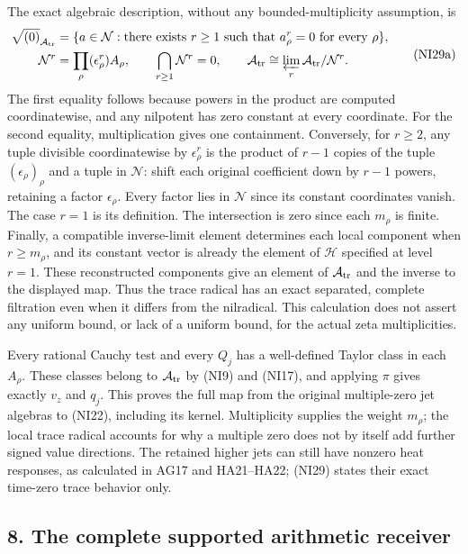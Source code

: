 \documentclass[
  10pt,
  a4paper,
]{article}
\begin{document}
The exact algebraic description, without any bounded-multiplicity
assumption, is \[
\begin{aligned}
\sqrt{(0)}_{\mathcal A_{\rm tr}}
&=\{a\in\mathcal N:\text{there exists }r\ge1
\text{ such that }a_\rho^r=0\text{ for every }\rho\},\\
\mathcal N^r&=\prod_\rho(\epsilon_\rho^r)A_\rho,
\qquad \bigcap_{r\ge1}\mathcal N^r=0,
\qquad \mathcal A_{\rm tr}\cong
\varprojlim_r\mathcal A_{\rm tr}/\mathcal N^r.
\end{aligned}
\tag{NI29a}
\] The first equality follows because powers in the product are computed
coordinatewise, and any nilpotent has zero constant at every coordinate.
For the second equality, multiplication gives one containment.
Conversely, for \(r\ge2\), any tuple divisible coordinatewise by
\(\epsilon_\rho^r\) is the product of \(r-1\) copies of the tuple
\((\epsilon_\rho)_\rho\) and a tuple in \(\mathcal N\): shift each
original coefficient down by \(r-1\) powers, retaining a factor
\(\epsilon_\rho\). Every factor lies in \(\mathcal N\) since its
constant coordinates vanish. The case \(r=1\) is its definition. The
intersection is zero since each \(m_\rho\) is finite. Finally, a
compatible inverse-limit element determines each local component when
\(r\ge m_\rho\), and its constant vector is already the element of
\(\mathcal H\) specified at level \(r=1\). These reconstructed
components give an element of \(\mathcal A_{\rm tr}\) and the inverse to
the displayed map. Thus the trace radical has an exact separated,
complete filtration even when it differs from the nilradical. This
calculation does not assert any uniform bound, or lack of a uniform
bound, for the actual zeta multiplicities.

Every rational Cauchy test and every \(Q_j\) has a well-defined Taylor
class in each \(A_\rho\). These classes belong to
\(\mathcal A_{\rm tr}\) by (NI9) and (NI17), and applying \(\pi\) gives
exactly \(v_z\) and \(q_j\). This proves the full map from the original
multiple-zero jet algebras to (NI22), including its kernel. Multiplicity
supplies the weight \(m_\rho\); the local trace radical accounts for why
a multiple zero does not by itself add further signed value directions.
The retained higher jets can still have nonzero heat responses, as
calculated in AG17 and HA21--HA22; (NI29) states their exact time-zero
trace behavior only.

\subsection{8. The complete supported arithmetic
receiver}\label{the-complete-supported-arithmetic-receiver}
\end{document}
